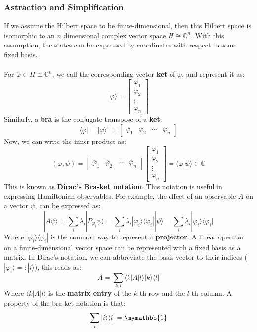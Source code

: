 \documentclass{article}
\begin{document}
\subsubsection{Astraction and Simplification}
If we assume the Hilbert space to be finite-dimensional, then this Hilbert space is isomorphic to an $n$ dimensional complex vector space $H \cong \mathbb{C}^n$. With this assumption, the states can be expressed by coordinates with respect to some fixed basis. \\ \\
For $\varphi \in H \cong \mathbb{C}^n$, we call the corresponding vector \textbf{ket} of $\varphi$, and represent it as:
\[ |\varphi\rangle = \begin{bmatrix} \varphi_1 \\ \varphi_2 \\ \vdots \\ \varphi_n \end{bmatrix} \]
Similarly, a \textbf{bra} is the conjugate transpose of a \textbf{ket}.
\[ \langle\varphi| = |\varphi\rangle^\dagger = \begin{bmatrix} \overline \varphi_1 & \overline \varphi_2 & \cdots & \overline \varphi_n \end{bmatrix} \]
Now, we can write the inner product as:
\[ (\varphi, \psi) = \begin{bmatrix} \overline \varphi_1 & \overline \varphi_2 & \cdots & \overline \varphi_n \end{bmatrix} \begin{bmatrix} \varphi_1 \\ \varphi_2 \\ \vdots \\ \varphi_n \end{bmatrix} = \langle \varphi|\psi\rangle \in \mathbb{C} \]
This is known as \textbf{Dirac's Bra-ket notation}. This notation is useful in expressing Hamiltonian observables. For example, the effect of an observable $A$ on a vector $\psi$, can be expressed as:
\[ |A\psi \rangle = \displaystyle \sum_i \lambda_i |P_{\varphi_i} \psi \rangle = \sum_i \lambda_i |\varphi_i \rangle \langle \varphi_i||\psi \rangle = \sum_i \lambda_i |\varphi_i \rangle \langle \varphi_i| \]
Where $|\varphi_i \rangle \langle \varphi_i|$ is the common way to represent a \textbf{projector}. A linear operator on a finite-dimensional vector space can be represented with a fixed basis as a matrix. In Dirac's notation, we can abbreviate the basis vector to their indices ($|\varphi_i \rangle =: |i\rangle$), this reads as:
\[ A = \displaystyle\sum_{k,l} \langle k | A | l \rangle |k\rangle \langle l| \]
Where $\langle k | A | l \rangle$ is the \textbf{matrix entry} of the $k$-th row and the $l$-th column. A property of the bra-ket notation is that:
\[ \sum_i |i\rangle\langle i| = \mymathbb{1} \]
\end{document}
